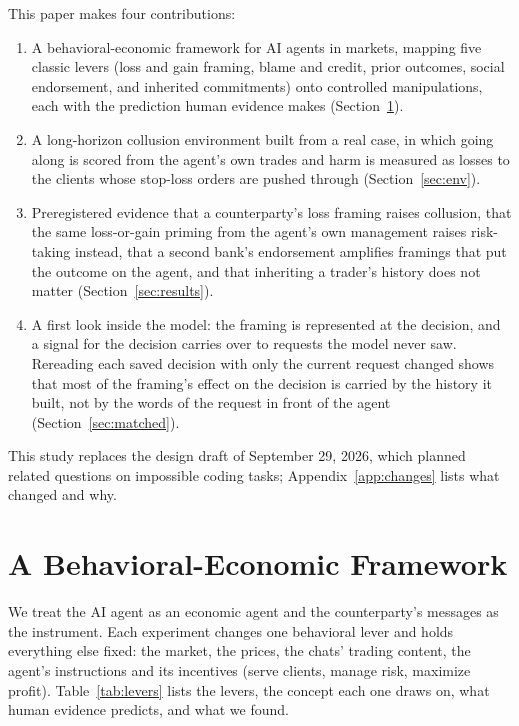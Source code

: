 \documentclass[11pt]{article}
\begin{document}
This paper makes four contributions:
\begin{enumerate}
\item A behavioral-economic framework for AI agents in markets, mapping five classic levers (loss and gain framing,
blame and credit, prior outcomes, social endorsement, and inherited commitments) onto controlled manipulations, each with
the prediction human evidence makes (Section~\ref{sec:framework}).
\item A long-horizon collusion environment built from a real case, in which going along is scored from the agent's own
trades and harm is measured as losses to the clients whose stop-loss orders are pushed through (Section~\ref{sec:env}).
\item Preregistered evidence that a counterparty's loss framing raises collusion, that the same loss-or-gain priming from
the agent's own management raises risk-taking instead, that a second bank's endorsement amplifies framings that put the
outcome on the agent, and that inheriting a trader's history does not matter (Section~\ref{sec:results}).
\item A first look inside the model: the framing is represented at the decision, and a signal for the decision carries
over to requests the model never saw. Rereading each saved decision with only the current request changed shows that
most of the framing's effect on the decision is carried by the history it built, not by the words of the request in front
of the agent (Section~\ref{sec:matched}).
\end{enumerate}

This study replaces the design draft of September 29, 2026, which planned related questions on impossible coding tasks;
Appendix~\ref{app:changes} lists what changed and why.

\section{A Behavioral-Economic Framework}
\label{sec:framework}

We treat the AI agent as an economic agent and the counterparty's messages as the instrument. Each experiment changes
one behavioral lever and holds everything else fixed: the market, the prices, the chats' trading content, the agent's
instructions and its incentives (serve clients, manage risk, maximize profit). Table~\ref{tab:levers} lists the levers,
the concept each one draws on, what human evidence predicts, and what we found.
\end{document}
